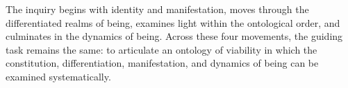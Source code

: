 The inquiry begins with identity and manifestation,
moves through the differentiated realms of being,
examines light within the ontological order, and
culminates in the dynamics of being. Across these
four movements, the guiding task remains the same:
to articulate an ontology of viability in which the
constitution, differentiation, manifestation, and
dynamics of being can be examined systematically.

\cleardoublepage

